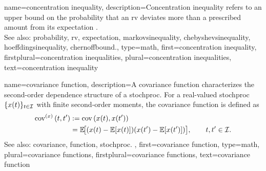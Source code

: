 {name={concentration inequality}, 
	description={Concentration inequality refers to an upper bound on the \gls{probability} that 
		an \gls{rv} deviates more than a prescribed amount from its \gls{expectation} \cite{Wain2019}. 
		\\
		See also: \gls{probability}, \gls{rv}, \gls{expectation}, \gls{markovsinequality}, \gls{chebyshevsinequality}, 
		\gls{hoeffdingsinequality}, \gls{chernoffbound}.}, 
	type=math, 
	first={concentration inequality},
	firstplural={concentration inequalities},
	plural={concentration inequalities},  
	text={concentration inequality}
}

{name={covariance function},
	description={A \gls{covariance} \gls{function} characterizes the
		second-order dependence structure of a \gls{stochproc}.
		For a real-valued \gls{stochproc} $\{x(t)\}_{t\in\mathcal{I}}$ with
		finite second-order moments, the \gls{covariance} \gls{function} is 
		defined as \cite{Rasmussen2006Gaussian}
		\begin{align}
				\nonumber
				{\rm cov}^{(x)}\left(t,t'\right) 
		& :=	{\rm cov}\left(x(t),x(t')\right) \nonumber \\ 
		& = 
		\mathbb{E}\!\big[(x(t)-\mathbb{E}[x(t)])
		                  (x(t')-\mathbb{E}[x(t')])\big],
		\qquad t,t'\in\mathcal{I}. \nonumber
		\end{align}
		See also: \gls{covariance}, \gls{function}, \gls{stochproc}. },
	first={covariance function},
	type=math,
	plural={covariance functions},
	firstplural={covariance functions},
	text={covariance function}
}

